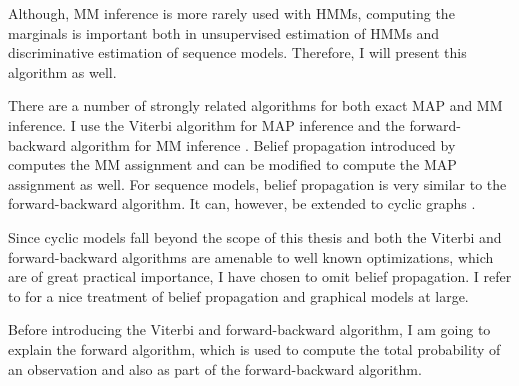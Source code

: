 Although, MM inference is more rarely used with HMMs, computing the
marginals is important both in unsupervised estimation of HMMs and
discriminative estimation of sequence models. Therefore, I will
present this algorithm as well.

There are a number of strongly related algorithms for both exact MAP
and MM inference. I use the Viterbi algorithm for MAP inference and
the forward-backward algorithm for MM inference
\citep{Rabiner1989}. Belief propagation introduced by \cite{Peral1982}
computes the MM assignment and can be modified to compute the MAP
assignment as well. For sequence models, belief propagation is very
similar to the forward-backward algorithm. It can, however, be
extended to cyclic graphs \citep{Weiss2000}. 

Since cyclic models fall beyond the scope of this thesis and both the
Viterbi and forward-backward algorithms are amenable to well known
optimizations, which are of great practical importance, I have chosen
to omit belief propagation. I refer to \cite{Koller2009} for a nice
treatment of belief propagation and graphical models at large.

Before introducing the Viterbi and forward-backward algorithm, I am
going to explain the forward algorithm, which is used to compute the
total probability of an observation and also as part of the
forward-backward algorithm.

